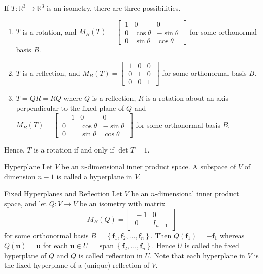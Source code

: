 \documentclass[12pt]{article}
\begin{document}
\begin{theorem}{}{}
    If $ T : \mathbb{R}^3 \to \mathbb{R}^3 $ is an isometry, there are three possibilities.
    \begin{enumerate}[label=(\roman*)]
        \item $ T $ is a rotation, and $ M_B \left( T \right) = \begin{bmatrix} \ 1 & 0 & 0 \ \\ \ 0 & \cos \theta & -\sin \theta \ \\ \ 0 & \sin \theta & \cos \theta \ \end{bmatrix} $ for some orthonormal basis $ B $.
        \item $ T $ is a reflection, and $ M_B \left( T \right) = \begin{bmatrix} \ 1 & 0 & 0 \ \\ \ 0 & 1 & 0 \ \\ \ 0 & 0 & 1 \ \end{bmatrix} $ for some orthonormal basis $ B $.
        \item $ T = QR = RQ $ where $ Q $ is a reflection, $ R $ is a rotation about an axis perpendicular to the fixed plane of $ Q $ and $ M_B \left( T \right) = \begin{bmatrix} \ -1 & 0 & 0 \ \\ \ 0 & \cos \theta & -\sin \theta \ \\ \ 0 & \sin \theta & \cos \theta \ \end{bmatrix} $ for some orthonormal basis $ B $.
    \end{enumerate}
    Hence, $ T $ is a rotation if and only if $ \det T = 1 $.
\end{theorem}

\begin{definition}{Hyperplane}{}
    Let $ V $ be an $ n $-dimensional inner product space. A subspace of $ V $ of dimension $ n - 1 $ is called a hyperplane in $ V $.
\end{definition}

\begin{definition}{Fixed Hyperplanes and Reflection}{}
    Let $ V $ be an $ n $-dimensional inner product space, and let $ Q : V \to V $ be an isometry with matrix
    \[ M_B \left( Q \right) = \begin{bmatrix} \ -1 & 0 \ \\ \ 0 & I_{n - 1} \ \end{bmatrix} \]
    for some orthonormal basis $ B = \left\{ \mathbf{f}_1, \mathbf{f}_2, \dots, \mathbf{f}_n \right\} $. Then $ Q \left( \mathbf{f}_1 \right) = -\mathbf{f}_1 $ whereas $ Q \left( \mathbf{u} \right) = \mathbf{u} $ for each $ \mathbf{u} \in U = \operatorname{span} \left\{ \mathbf{f}_2, \dots, \mathbf{f}_n \right\} $. Hence $ U $ is called the fixed hyperplane of $ Q $ and $ Q $ is called reflection in $ U $. Note that each hyperplane in $ V $ is the fixed hyperplane of a (unique) reflection of $ V $.
\end{definition}
\end{document}
